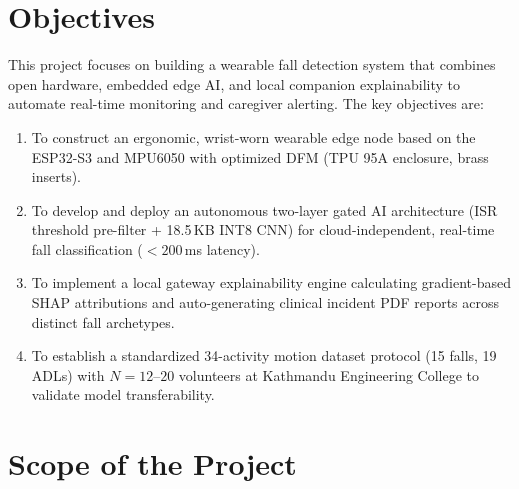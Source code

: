 \section{Objectives}

This project focuses on building a wearable fall detection system that combines open hardware, embedded edge AI, and local companion explainability to automate real-time monitoring and caregiver alerting. The key objectives are:
\begin{enumerate}
\item To construct an ergonomic, wrist-worn wearable edge node based on the ESP32-S3 and MPU6050 with optimized DFM (TPU 95A enclosure, brass inserts).
\item To develop and deploy an autonomous two-layer gated AI architecture (ISR threshold pre-filter + 18.5\,KB INT8 CNN) for cloud-independent, real-time fall classification ($<200$\,ms latency).
\item To implement a local gateway explainability engine calculating gradient-based SHAP attributions and auto-generating clinical incident PDF reports across distinct fall archetypes.
\item To establish a standardized 34-activity motion dataset protocol (15 falls, 19 ADLs) with $N=12\text{--}20$ volunteers at Kathmandu Engineering College to validate model transferability.
\end{enumerate}

\section{Scope of the Project}\label{sec:scope}

